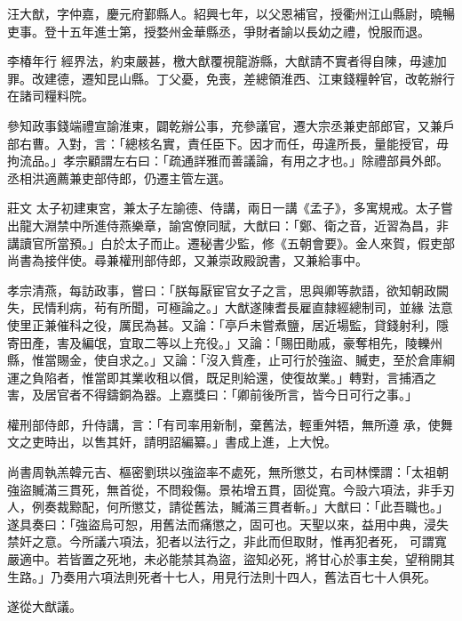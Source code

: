 \begin{pinyinscope}
 汪大猷，字仲嘉，慶元府鄞縣人。紹興七年，以父恩補官，授衢州江山縣尉，曉暢吏事。登十五年進士第，授婺州金華縣丞，爭財者諭以長幼之禮，悅服而退。



 李椿年行
 經界法，約束嚴甚，檄大猷覆視龍游縣，大猷請不實者得自陳，毋遽加罪。改建德，遷知昆山縣。丁父憂，免喪，差總領淮西、江東錢糧幹官，改乾辦行在諸司糧料院。



 參知政事錢端禮宣諭淮東，闢乾辦公事，充參議官，遷大宗丞兼吏部郎官，又兼戶部右曹。入對，言：「總核名實，責任臣下。因才而任，毋違所長，量能授官，毋拘流品。」孝宗顧謂左右曰：「疏通詳雅而善議論，有用之才也。」除禮部員外郎。丞相洪適薦兼吏部侍郎，仍遷主管左選。



 莊文
 太子初建東宮，兼太子左諭德、侍講，兩日一講《孟子》，多寓規戒。太子嘗出龍大淵禁中所進侍燕樂章，諭宮僚同賦，大猷曰：「鄭、衛之音，近習為昌，非講讀官所當預。」白於太子而止。遷秘書少監，修《五朝會要》。金人來賀，假吏部尚書為接伴使。尋兼權刑部侍郎，又兼崇政殿說書，又兼給事中。



 孝宗清燕，每訪政事，嘗曰：「朕每厭宦官女子之言，思與卿等款語，欲知朝政闕失，民情利病，茍有所聞，可極論之。」大猷遂陳耆長雇直隸經總制司，並緣
 法意使里正兼催科之役，厲民為甚。又論：「亭戶未嘗煮鹽，居近場監，貸錢射利，隱寄田產，害及編氓，宜取二等以上充役。」又論：「賜田勛戚，豪奪相先，陵轢州縣，惟當賜金，使自求之。」又論：「沒入貲產，止可行於強盜、贓吏，至於倉庫綱運之負陷者，惟當即其業收租以償，既足則給還，使復故業。」轉對，言捕酒之害，及居官者不得鑄銅為器。上嘉獎曰：「卿前後所言，皆今日可行之事。」



 權刑部侍郎，升侍講，言：「有司率用新制，棄舊法，輕重舛牾，無所遵
 承，使舞文之吏時出，以售其奸，請明詔編纂。」書成上進，上大悅。



 尚書周執羔韓元吉、樞密劉珙以強盜率不處死，無所懲艾，右司林慄謂：「太祖朝強盜贓滿三貫死，無首從，不問殺傷。景祐增五貫，固從寬。今設六項法，非手刃人，例奏裁黥配，何所懲艾，請從舊法，贓滿三貫者斬。」大猷曰：「此吾職也。」遂具奏曰：「強盜烏可恕，用舊法而痛懲之，固可也。天聖以來，益用中典，浸失禁奸之意。今所議六項法，犯者以法行之，非此而但取財，惟再犯者死，
 可謂寬嚴適中。若皆置之死地，未必能禁其為盜，盜知必死，將甘心於事主矣，望稍開其生路。」乃奏用六項法則死者十七人，用見行法則十四人，舊法百七十人俱死。



 遂從大猷議。




\end{pinyinscope}
